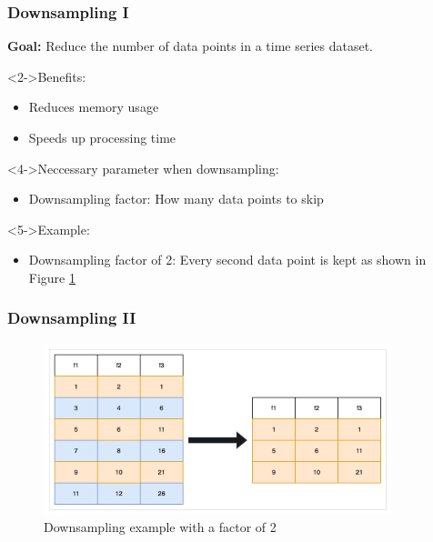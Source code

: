 \documentclass[t,english]{beamer}
\begin{document}
\begin{frame}
  \frametitle{Downsampling I}
  \textbf{Goal:} Reduce the number of data points in a time series dataset.

  \begin{block}<2->{Benefits:}
    \begin{itemize}
      \item<2-> Reduces memory usage
      \item<3-> Speeds up processing time
    \end{itemize}
  \end{block}

  \begin{block}<4->{Neccessary parameter when downsampling:}
    \begin{itemize}
      \item<4-> Downsampling factor: How many data points to skip
    \end{itemize}
  \end{block}

  \begin{block}<5->{Example:}
    \begin{itemize}
      \item<5-> Downsampling factor of 2: Every second data point is kept as shown in Figure \ref{fig:downsampling}
    \end{itemize}
  \end{block}

\end{frame}

\begin{frame}
  \frametitle{Downsampling II}
  \begin{figure}[H]
    \includegraphics[width=0.9\textwidth]{figures/downsampling/downsampling.png}
    \caption{Downsampling example with a factor of 2}
    \label{fig:downsampling}
  \end{figure}

\end{frame}
\end{document}

